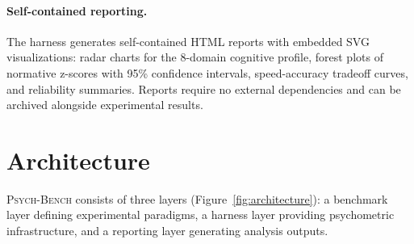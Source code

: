 \documentclass[11pt,letterpaper]{article}
\newcommand{\psychbench}{\textsc{Psych-Bench}}
\begin{document}
\paragraph{Self-contained reporting.} The harness generates self-contained HTML reports with embedded SVG visualizations: radar charts for the 8-domain cognitive profile, forest plots of normative z-scores with 95\% confidence intervals, speed-accuracy tradeoff curves, and reliability summaries. Reports require no external dependencies and can be archived alongside experimental results.

\section{Architecture}
\label{sec:architecture}

\psychbench{} consists of three layers (Figure~\ref{fig:architecture}): a benchmark layer defining experimental paradigms, a harness layer providing psychometric infrastructure, and a reporting layer generating analysis outputs.
\end{document}
